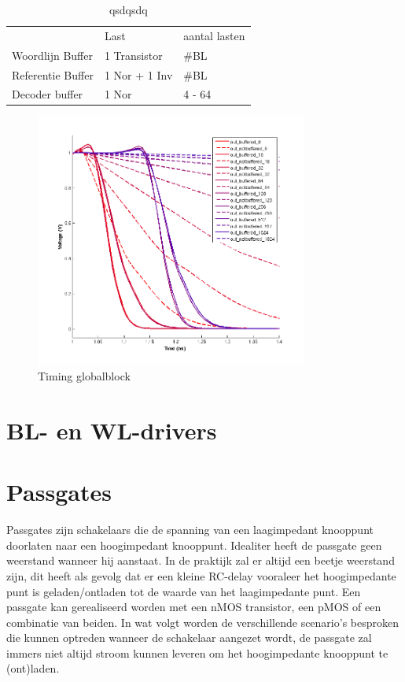 \begin{table}
\begin{center}
\begin{tabular}{lll}
 & Last & aantal lasten\\
Woordlijn Buffer & 1 Transistor &  \#BL\\
Referentie Buffer & 1 Nor + 1 Inv &  \#BL\\
Decoder buffer & 1 Nor & 4 - 64
\end{tabular}\label{tab:buffer}
\end{center}
\caption{qsdqsdq}
\end{table}

\begin{figure}[!ht]
  \centering
  \includegraphics[width=0.8\textwidth]{../fig/hfdst-buffers-refbuffer.png}
  \caption{Timing globalblock}
  \label{fig:refbuffer}
\end{figure}

\section{BL- en WL-drivers}

\section{Passgates}
Passgates zijn schakelaars die de spanning van een laagimpedant knooppunt doorlaten naar een hoogimpedant knooppunt. Idealiter heeft de passgate geen weerstand wanneer hij aanstaat. In de praktijk zal er altijd een beetje weerstand zijn, dit heeft als gevolg dat er een kleine RC-delay vooraleer het hoogimpedante punt is geladen/ontladen tot de waarde van het laagimpedante punt.
Een passgate kan gerealiseerd worden met een nMOS transistor, een pMOS of een combinatie van beiden.
In wat volgt worden de verschillende scenario's besproken die kunnen optreden wanneer de schakelaar aangezet wordt, de passgate zal immers niet altijd stroom kunnen leveren om het hoogimpedante knooppunt te (ont)laden.

